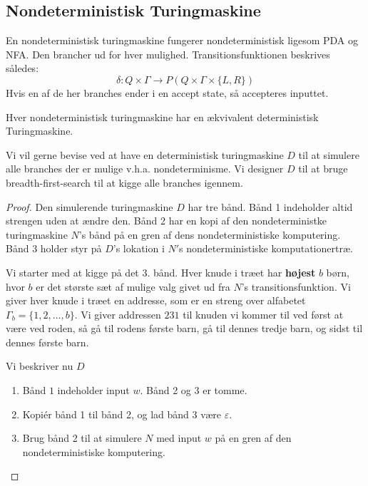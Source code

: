 \subsection{Nondeterministisk Turingmaskine}%
\label{subsec:nondeterministicturingmachine}

En nondeterministisk turingmaskine fungerer nondeterministisk ligesom PDA og NFA. Den brancher ud for hver mulighed. Transitionsfunktionen beskrives således:
\[ \delta : Q \times \Gamma \longrightarrow P(Q \times \Gamma \times \{L, R\})\] Hvis en af de her branches ender i en accept state, så accepteres inputtet.

\begin{theorem}
\label{teo:nondeterminismturingequiv}
Hver nondeterministisk turingmaskine har en ækvivalent deterministisk Turingmaskine.
\end{theorem}

Vi vil gerne bevise ved at have en deterministisk turingmaskine $D$ til at simulere alle branches der er mulige v.h.a. nondeterminisme. Vi designer $D$ til at bruge breadth-first-search til at kigge alle branches igennem.

\begin{proof}
  Den simulerende turingmaskine $D$ har tre bånd. Bånd 1 indeholder altid strengen uden at ændre den. Bånd 2 har en kopi af den nondeterministke turingmaskine $N$'s bånd på en gren af dens nondeterministiske komputering. Bånd 3 holder styr på $D$'s lokation i $N'$s nondeterministiske komputationertræ.

  Vi starter med at kigge på det 3. bånd. Hver knude i træet har \textbf{højest} $b$ børn, hvor $b$ er det største sæt af mulige valg givet ud fra $N$'s transitionsfunktion. Vi giver hver knude i træet en addresse, som er en streng over alfabetet $\Gamma_{b} = \{1, 2, \ldots, b\}$. Vi giver addressen $231$ til knuden vi kommer til ved først at være ved roden, så gå til rodens første barn, gå til dennes tredje barn, og sidst til dennes første barn.

  Vi beskriver nu $D$

  \begin{enumerate}
    \item Bånd $1$ indeholder input $w$. Bånd 2 og 3 er tomme.
    \item Kopiér bånd 1 til bånd 2, og lad bånd 3 være $\varepsilon$.
    \item Brug bånd 2 til at simulere $N$ med input $w$ på en gren af den nondeterministiske komputering.  %
  \end{enumerate}
\end{proof}

